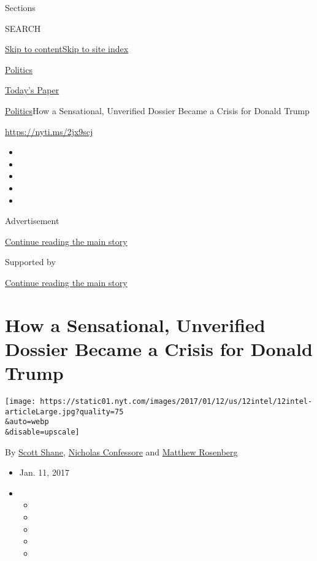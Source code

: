 Sections

SEARCH

\protect\hyperlink{site-content}{Skip to
content}\protect\hyperlink{site-index}{Skip to site index}

\href{https://www.nytimes.com/section/politics}{Politics}

\href{https://myaccount.nytimes.com/auth/login?response_type=cookie\&client_id=vi}{}

\href{https://www.nytimes.com/section/todayspaper}{Today's Paper}

\href{/section/politics}{Politics}\textbar{}How a Sensational,
Unverified Dossier Became a Crisis for Donald Trump

\url{https://nyti.ms/2jx9scj}

\begin{itemize}
\item
\item
\item
\item
\item
\end{itemize}

Advertisement

\protect\hyperlink{after-top}{Continue reading the main story}

Supported by

\protect\hyperlink{after-sponsor}{Continue reading the main story}

\hypertarget{how-a-sensational-unverified-dossier-became-a-crisis-for-donald-trump}{%
\section{How a Sensational, Unverified Dossier Became a Crisis for
Donald
Trump}\label{how-a-sensational-unverified-dossier-became-a-crisis-for-donald-trump}}

\texttt{[image: https://static01.nyt.com/images/2017/01/12/us/12intel/12intel-articleLarge.jpg?quality=75\\\&auto=webp\\\&disable=upscale]}

By \href{http://www.nytimes.com/by/scott-shane}{Scott Shane},
\href{http://www.nytimes.com/by/nicholas-confessore}{Nicholas
Confessore} and
\href{http://www.nytimes.com/by/matthew-rosenberg}{Matthew Rosenberg}

\begin{itemize}
\item
  Jan. 11, 2017
\item
  \begin{itemize}
  \item
  \item
  \item
  \item
  \item
  \end{itemize}
\end{itemize}

